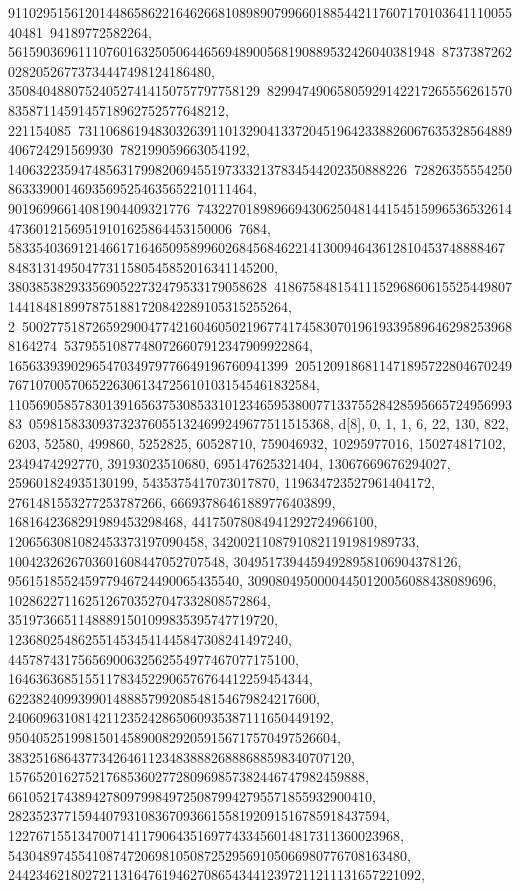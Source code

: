 {{{91102951561201448658622164626681089890799660188544211760717010364111005540481\
94189772582264, 5615903696111076016325050644656948900568190889532426040381948\
873738726202820526773734447498124186480, 350840488075240527414150757797758129\
829947490658059291422172655562615708358711459145718962752577648212, 221154085\
73110686194830326391101329041337204519642338826067635328564889406724291569930\
782199059663054192, 140632235947485631799820694551973332137834544202350888226\
7282635555425086333900146935695254635652210111464, 90196996614081904409321776\
74322701898966943062504814415451599653653261447360121569519101625864453150006\
7684, 58335403691214661716465095899602684568462214130094643612810453748888467\
84831314950477311580545852016341145200, 3803853829335690522732479533179058628\
41867584815411152968606155254498071441848189978751881720842289105315255264, 2\
50027751872659290047742160460502196774174583070196193395896462982539688164274\
53795510877480726607912347909922864, 1656339390296547034979776649196760941399\
205120918681147189572280467024976710700570652263061347256101031545461832584, 
   11056905857830139165637530853310123465953800771337552842859566572495699383\
0598158330937323760551324699249677511515368}}, 
 {d[8], {0, 1, 1, 6, 22, 130, 822, 6203, 52580, 499860, 5252825, 60528710, 
   759046932, 10295977016, 150274817102, 2349474292770, 39193023510680, 
   695147625321404, 13067669676294027, 259601824935130199, 
   5435375417073017870, 119634723527961404172, 2761481553277253787266, 
   66693786461889776403899, 1681642368291989453298468, 
   44175078084941292724966100, 1206563081082453373197090458, 
   34200211087910821191981989733, 1004232626703601608447052707548, 
   30495173944594928958106904378126, 956151855245977946724490065435540, 
   30908049500004450120056088438089696, 
   1028622711625126703527047332808572864, 
   35197366511488891501099835395747719720, 
   1236802548625514534541445847308241497240, 
   44578743175656900632562554977467077175100, 
   1646363685155117834522906576764412259454344, 
   62238240993990148885799208548154679824217600, 
   2406096310814211235242865060935387111650449192, 
   95040525199815014589008292059156717570497526604, 
   3832516864377342646112348388826888688598340707120, 
   157652016275217685360277280969857382446747982459888, 
   6610521743894278097998497250879942795571855932900410, 
   282352377159440793108367093661558192091516785918437594, 
   12276715513470071411790643516977433456014817311360023968, 
   543048974554108747206981050872529569105066980776708163480, 
   24423462180272113164761946270865434412397211211131657221092, 
}}}

